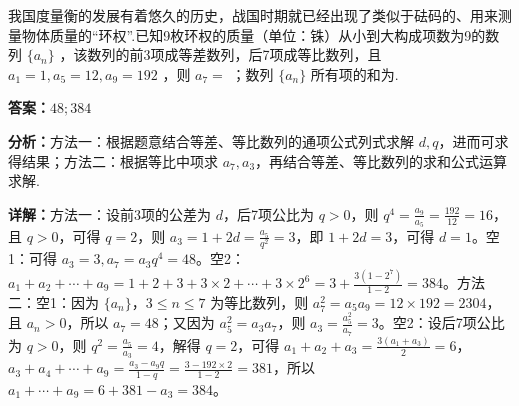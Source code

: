 \begin{question}[points=5]
我国度量衡的发展有着悠久的历史，战国时期就已经出现了类似于砝码的、用来测量物体质量的“环权”.已知9枚环权的质量（单位：铢）从小到大构成项数为9的数列 $\{a_n\}$ ，该数列的前3项成等差数列，后7项成等比数列，且 $a_1=1, a_5=12, a_9=192$ ，则 $a_7=$ ；数列 $\{a_n\}$ 所有项的和为.
\fillin[{$48 ; 384$}]
\begin{solution}
\textbf{答案：}$48 ; 384$

\textbf{分析：}方法一：根据题意结合等差、等比数列的通项公式列式求解 $d,q$，进而可求得结果；方法二：根据等比中项求 $a_7,a_3$，再结合等差、等比数列的求和公式运算求解.

\textbf{详解：}方法一：设前3项的公差为 $d$，后7项公比为 $q>0$，则 $q^4=\frac{a_9}{a_5}=\frac{192}{12}=16$，且 $q>0$，可得 $q=2$，则 $a_3=1+2d=\frac{a_5}{q^2}=3$，即 $1+2d=3$，可得 $d=1$。空1：可得 $a_3=3, a_7=a_3q^4=48$。空2：$a_1+a_2+\cdots+a_9=1+2+3+3\times2+\cdots+3\times2^6=3+\frac{3(1-2^7)}{1-2}=384$。方法二：空1：因为 $\{a_n\}$，$3\le n\le 7$ 为等比数列，则 $a_7^2=a_5a_9=12\times192=2304$，且 $a_n>0$，所以 $a_7=48$；又因为 $a_5^2=a_3a_7$，则 $a_3=\frac{a_5^2}{a_7}=3$。空2：设后7项公比为 $q>0$，则 $q^2=\frac{a_5}{a_3}=4$，解得 $q=2$，可得 $a_1+a_2+a_3=\frac{3(a_1+a_3)}{2}=6$，$a_3+a_4+\cdots+a_9=\frac{a_3-a_9q}{1-q}=\frac{3-192\times2}{1-2}=381$，所以 $a_1+\cdots+a_9=6+381-a_3=384$。
\end{solution}
\end{question}

